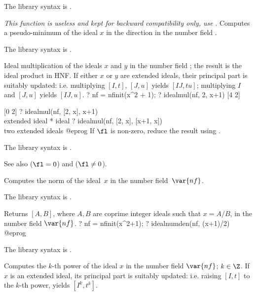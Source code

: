The library syntax is .

\label{se:idealmin}
\emph{This function is useless and kept for backward compatibility only,
use }. Computes a pseudo-minimum of the ideal $x$ in the
direction  in the number field .

The library syntax is .

\label{se:idealmul}
Ideal multiplication of the ideals $x$ and $y$ in the number field
; the result is the ideal product in HNF. If either $x$ or $y$
are extended ideals, their principal part is suitably
updated: i.e. multiplying $[I,t]$, $[J,u]$ yields $[IJ, tu]$; multiplying
$I$ and $[J, u]$ yields $[IJ, u]$.
\bprog
? nf = nfinit(x^2 + 1);
? idealmul(nf, 2, x+1)
[4 2]

[0 2]
? idealmul(nf, [2, x], x+1)        \\ extended ideal * ideal
? idealmul(nf, [2, x], [x+1, x])   \\ two extended ideals
@eprog\noindent
If $\fl$ is non-zero, reduce the result using .

The library syntax is .

\noindent See also
 ($\fl=0$) and
 ($\fl\neq0$).

\label{se:idealnorm}
Computes the norm of the ideal~$x$ in the number field~$\var{nf}$.

The library syntax is .

\label{se:idealnumden}
Returns $[A,B]$, where $A,B$ are coprime integer ideals
such that $x = A/B$, in the number field $\var{nf}$.
\bprog
? nf = nfinit(x^2+1);
? idealnumden(nf, (x+1)/2)
@eprog

The library syntax is .

\label{se:idealpow}
Computes the $k$-th power of
the ideal $x$ in the number field $\var{nf}$; $k\in\Z$.
If $x$ is an extended
ideal, its principal part is suitably
updated: i.e. raising $[I,t]$ to the $k$-th power, yields $[I^k, t^k]$.

